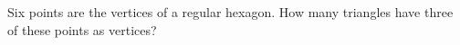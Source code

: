 Six points are the vertices of a regular hexagon. How many triangles have three of these points as vertices?
